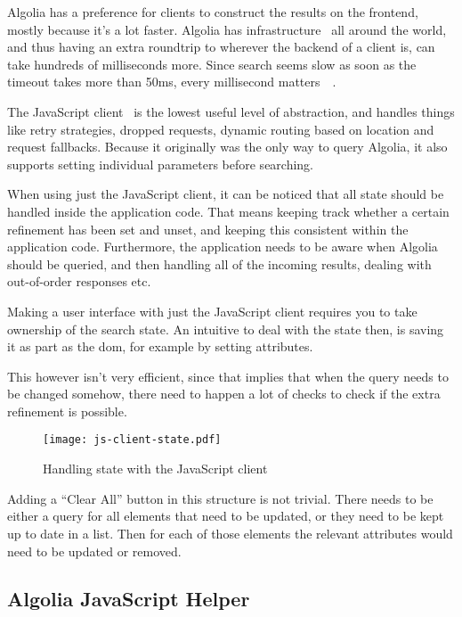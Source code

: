 Algolia has a preference for clients to construct the results on the frontend, mostly because it's a lot faster. Algolia has infrastructure~\cite{algolia-infra} all around the world, and thus having an extra roundtrip to wherever the backend of a client is, can take hundreds of milliseconds more. Since search seems slow as soon as the timeout takes more than 50ms, every millisecond matters~\cite{google-slow}~.

The JavaScript client~\cite{algolia-js-client} is the lowest useful level of abstraction, and handles things like retry strategies, dropped requests, dynamic routing based on location and request fallbacks. Because it originally was the only way to query Algolia, it also supports setting individual parameters before searching.

When using just the JavaScript client, it can be noticed that all state should be handled inside the application code. That means keeping track whether a certain refinement has been set and unset, and keeping this consistent within the application code. Furthermore, the application needs to be aware when Algolia should be queried, and then handling all of the incoming results, dealing with out-of-order responses etc.

Making a user interface with just the JavaScript client requires you to take ownership of the search state. An intuitive to deal with the state then, is saving it as part as the \acrshort{dom}, for example by setting attributes.

This however isn't very efficient, since that implies that when the query needs to be changed somehow, there need to happen a lot of checks to check if the extra refinement is possible.

\begin{figure}[H]
  \centering
  \texttt{[image: js-client-state.pdf]}
  \caption{Handling state with the JavaScript client}
  \label{figure:js-client-state}
\end{figure}

Adding a ``Clear All'' button in this structure is not trivial. There needs to be either a query for all elements that need to be updated, or they need to be kept up to date in a list. Then for each of those elements the relevant attributes would need to be updated or removed.


\subsection{Algolia JavaScript Helper} %
\label{sub:algolia_js_helper}

